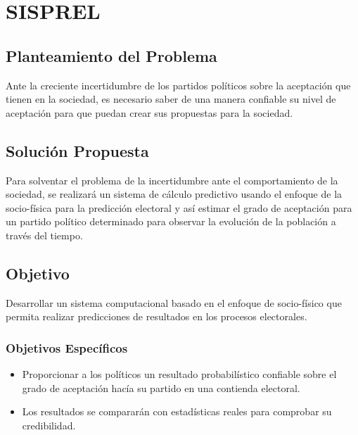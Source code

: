 \chapter{SISPREL}
	\vspace*{2cm}
\section{Planteamiento del Problema}
Ante la creciente incertidumbre de los partidos políticos sobre la aceptación que tienen en la sociedad, es necesario saber de una manera confiable su nivel de aceptación para que puedan crear sus propuestas para la sociedad.

\section{Solución Propuesta}
Para solventar el problema de la incertidumbre ante el comportamiento de la sociedad, se realizará un sistema de cálculo predictivo usando el enfoque de la socio-física para la predicción electoral y así estimar el grado de aceptación para un partido político determinado para observar la evolución de la población a través del tiempo.

\section{Objetivo}
Desarrollar un sistema computacional basado en el enfoque de socio-físico que permita realizar predicciones de resultados en los procesos electorales. 

\subsection{Objetivos Específicos}
\begin{itemize}
    \item Proporcionar a los políticos un resultado probabilístico confiable sobre el grado de aceptación hacía su partido en una contienda electoral.
    \item Los resultados se compararán con estadísticas reales para comprobar su credibilidad.
\end{itemize}

